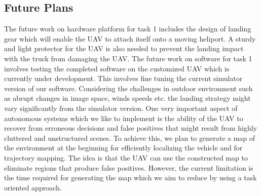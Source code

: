 \documentclass{standalone}
\begin{document}
\subsection{Future Plans}
The future work on hardware platform for task 1 includes the design of landing gear which will enable the UAV to attach itself onto a moving heliport. A sturdy and light protector for the UAV is also needed to prevent the landing impact with the truck from damaging the UAV.
The future work on software for task 1 involves testing the completed software on the customized UAV which is currently under development. This involves fine tuning the current simulator version of our software. Considering the challenges in outdoor environment such as abrupt changes in image space, winds speeds etc. the landing strategy might vary significantly from the simulator version. One very important aspect of autonomous systems which we like to implement is the ability of the UAV to recover from erroneous decisions and false positives that might result from highly cluttered and unstructured scenes. To achieve this, we plan to generate a map of the environment at the beginning for efficiently localizing the vehicle and for trajectory mapping. The idea is that the UAV can use the constructed map to eliminate regions that produce false positives. However, the current limitation is the time required for generating the map which we aim to reduce by using a task oriented approach.



\end{document}
